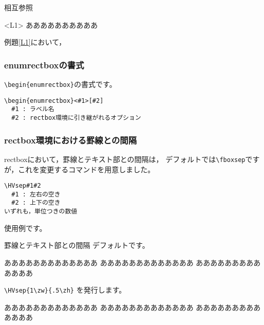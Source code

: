 \begin{showEx}{相互参照}
\def\labelrectboxenum{%
例題\arabic{rectboxenum}}
\begin{enumrectbox}<L1>
ああああああああああ
\end{enumrectbox}

\begin{enumrectbox}
例題\ref{L1}において，
\end{enumrectbox}
\end{showEx}

\subsubsection{\textsf{enumrectbox}の書式}
\verb+\begin{enumrectbox}+の書式です。

\begin{boxnote}
\begin{verbatim}
\begin{enumrectbox}<#1>[#2]
  #1 : ラベル名
  #2 : rectbox環境に引き継がれるオプション
\end{verbatim}
\end{boxnote}

\subsubsection{\textsf{rectbox}環境における罫線との間隔}
\textsf{rectbox}において，罫線とテキスト部との間隔は，
デフォルトでは\verb+\fboxsep+ですが，これを変更するコマンドを用意しました。

\begin{boxnote}
\begin{verbatim}
\HVsep#1#2
  #1 : 左右の空き
  #2 : 上下の空き
いずれも，単位つきの数値
\end{verbatim}
\end{boxnote}

使用例です。

\begin{showEx}{罫線とテキスト部との間隔}
デフォルトです。

\begin{rectbox}
あああああああああああああ
あああああああああああああ
あああああああああああああ
\end{rectbox}

\verb+\HVsep{1\zw}{.5\zh}+
を発行します。

\HVsep{1\zw}{.5\zh}
\begin{rectbox}
あああああああああああああ
あああああああああああああ
あああああああああああああ
\end{rectbox}
\end{showEx}

